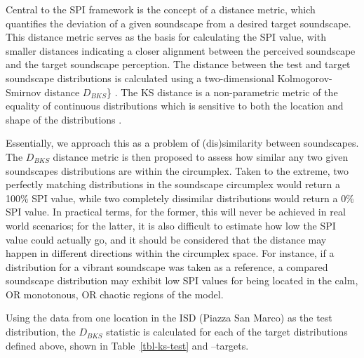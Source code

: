 \documentclass[
  authoryear,
  preprint,
  1p]{elsarticle}
\begin{document}
Central to the SPI framework is the concept of a distance metric, which
quantifies the deviation of a given soundscape from a desired target
soundscape. This distance metric serves as the basis for calculating the
SPI value, with smaller distances indicating a closer alignment between
the perceived soundscape and the target soundscape perception. The
distance between the test and target soundscape distributions is
calculated using a two-dimensional Kolmogorov-Smirnov distance
\(D_{BKS}\)\} \citep{Fasano1987multidimensional}. The KS distance is a
non-parametric metric of the equality of continuous distributions which
is sensitive to both the location and shape of the distributions
\citep{Chakravati1967Handbook}.

Essentially, we approach this as a problem of (dis)similarity between
soundscapes. The \(D_{BKS}\) distance metric is then proposed to assess
how similar any two given soundscapes distributions are within the
circumplex. Taken to the extreme, two perfectly matching distributions
in the soundscape circumplex would return a 100\% SPI value, while two
completely dissimilar distributions would return a 0\% SPI value. In
practical terms, for the former, this will never be achieved in real
world scenarios; for the latter, it is also difficult to estimate how
low the SPI value could actually go, and it should be considered that
the distance may happen in different directions within the circumplex
space. For instance, if a distribution for a vibrant soundscape was
taken as a reference, a compared soundscape distribution may exhibit low
SPI values for being located in the calm, OR monotonous, OR chaotic
regions of the model.

Using the data from one location in the ISD (Piazza San Marco) as the
test distribution, the \(D_{BKS}\) statistic is calculated for each of
the target distributions defined above, shown in Table~\ref{tbl-ks-test}
and \citet{fig}--targets.
\end{document}
